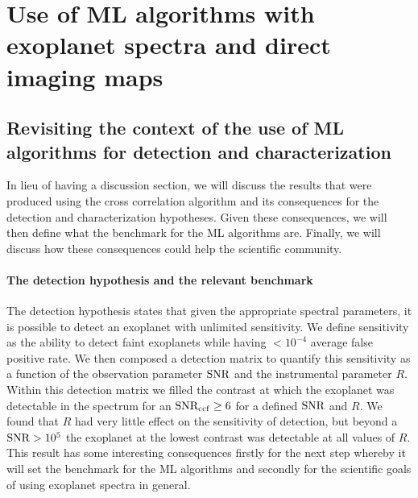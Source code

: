 \part{Use of ML algorithms with exoplanet spectra and direct imaging maps}
\startcontents[chapters]
\printmyminitoc{}

\chapter{Revisiting the context of the use of ML algorithms for detection and characterization}
In lieu of having a discussion section, we will discuss the results that were produced using the cross correlation algorithm and its consequences for the detection and characterization hypotheses.
Given these consequences, we will then define what the benchmark for the ML algorithms are. 
Finally, we will discuss how these consequences could help the scientific community.
\subsection{The detection hypothesis and the relevant benchmark}
The detection hypothesis states that given the appropriate spectral parameters, it is possible to detect an exoplanet with unlimited sensitivity.
We define sensitivity as the ability to detect faint exoplanets while having $<10^{-4}$ average false positive rate.
We then composed a detection matrix to quantify this sensitivity as a function of the observation parameter $\rm{SNR}$ and the instrumental parameter $R$.
Within this detection matrix we filled the contrast at which the exoplanet was detectable in the spectrum for an $\rm{SNR_{ccf}}\ge6$ for a defined $\rm{SNR}$ and $R$.
We found that $R$ had very little effect on the sensitivity of detection, but beyond a $\rm{SNR}>10^{5}$ the exoplanet at the lowest contrast was detectable at all values of $R$. 
This result has some interesting consequences firstly for the next step whereby it will set the benchmark for the ML algorithms and secondly for the scientific goals of using exoplanet spectra in general.

